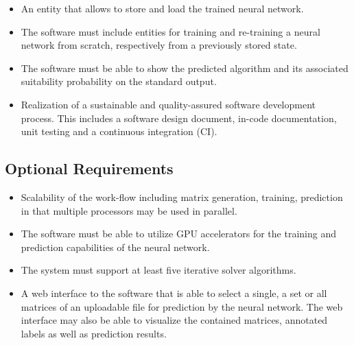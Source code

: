 \documentclass[parskip=full]{scrartcl}
\begin{document}
\begin{itemize}
\item An entity that allows to store and load the trained \gls{neural network}.

\item The software must include entities for training and re-training a \gls{neural network} from scratch, respectively from a previously stored state.

\item The software must be able to show the predicted \gls{algorithm} and its associated suitability probability on the standard output.

\item Realization of a sustainable and quality-assured software development process. This includes a software design document, in-code documentation, unit testing and a continuous integration (CI).

\end{itemize}

\subsection{Optional Requirements}

\begin{itemize}
    
\item Scalability of the work-flow including matrix generation, training, prediction in that multiple processors may be used in parallel.

\item The software must be able to utilize GPU accelerators for the training and prediction capabilities of the \gls{neural network}.

\item The system must support at least five \gls{iterative solver} \glspl{algorithm}.

\item A web interface to the software that is able to select a single, a set or all matrices of an uploadable file for prediction by the \gls{neural network}. The web interface may also be able to visualize the contained matrices, annotated labels as well as prediction results.

\end{itemize}
\end{document}
